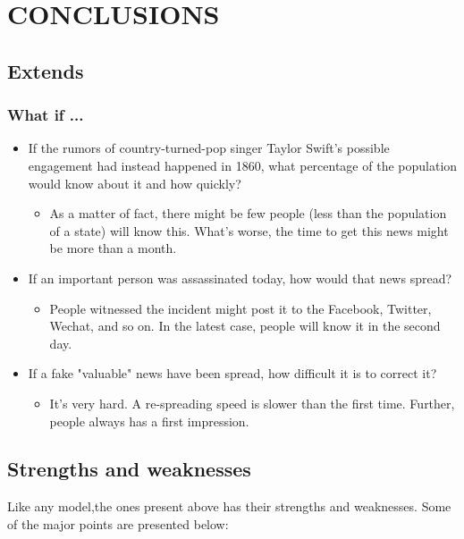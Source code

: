 \par 
\section{CONCLUSIONS}
\subsection{Extends}
\subsubsection*{What if ...}
\begin{itemize}
	\item If the rumors of country-turned-pop singer Taylor Swift’s possible engagement had instead happened in 1860, what percentage of the population would know about
	it and how quickly?
	\begin{itemize}
		\item As a matter of fact, there might be few people (less than the population of a state) will know this. What's worse, the time to get this news might be more than a month.
	\end{itemize}
	\item If an important person was assassinated today, how would that news spread?
	\begin{itemize}
		\item People witnessed the incident might post it to the Facebook, Twitter, Wechat, and so on. In the latest case, people will know it in the second day.
	\end{itemize}
	\item If a fake "valuable" news have been spread, how difficult it is to correct it? 
	\begin{itemize}
		\item It's very hard. A re-spreading speed is slower than the first time. Further, people always has a first impression.
		
	\end{itemize}
\end{itemize}
\par 
 
 
\subsection{Strengths and weaknesses}
Like any model,the ones present above has their strengths and
weaknesses. Some of the major points are presented below:


